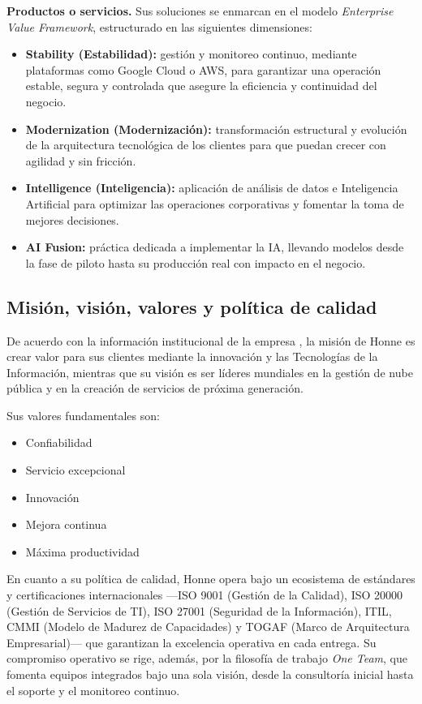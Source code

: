 \textbf{Productos o servicios.} Sus soluciones se enmarcan en el modelo \textit{Enterprise Value Framework}, estructurado en las siguientes dimensiones:
\begin{itemize}
    \item \textbf{Stability (Estabilidad):} gestión y monitoreo continuo, mediante plataformas como Google Cloud o AWS, para garantizar una operación estable, segura y controlada que asegure la eficiencia y continuidad del negocio.
    \item \textbf{Modernization (Modernización):} transformación estructural y evolución de la arquitectura tecnológica de los clientes para que puedan crecer con agilidad y sin fricción.
    \item \textbf{Intelligence (Inteligencia):} aplicación de análisis de datos e Inteligencia Artificial para optimizar las operaciones corporativas y fomentar la toma de mejores decisiones.
    \item \textbf{AI Fusion:} práctica dedicada a implementar la IA, llevando modelos desde la fase de piloto hasta su producción real con impacto en el negocio.
\end{itemize}

\subsection{Misión, visión, valores y política de calidad}
\label{sec:mision_vision}

De acuerdo con la información institucional de la empresa \cite{honne_oficial_2026}, la misión de Honne es crear valor para sus clientes mediante la innovación y las Tecnologías de la Información, mientras que su visión es ser líderes mundiales en la gestión de nube pública y en la creación de servicios de próxima generación.

Sus valores fundamentales son:
\begin{itemize}
    \item Confiabilidad
    \item Servicio excepcional
    \item Innovación
    \item Mejora continua
    \item Máxima productividad
\end{itemize}

En cuanto a su política de calidad, Honne opera bajo un ecosistema de estándares y certificaciones internacionales —ISO 9001 (Gestión de la Calidad), ISO 20000 (Gestión de Servicios de TI), ISO 27001 (Seguridad de la Información), ITIL, CMMI (Modelo de Madurez de Capacidades) y TOGAF (Marco de Arquitectura Empresarial)— que garantizan la excelencia operativa en cada entrega. Su compromiso operativo se rige, además, por la filosofía de trabajo \textit{One Team}, que fomenta equipos integrados bajo una sola visión, desde la consultoría inicial hasta el soporte y el monitoreo continuo.

